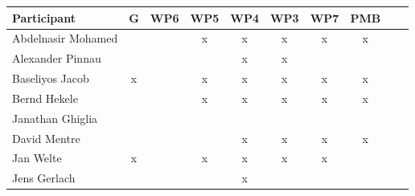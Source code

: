 \documentclass[a4paper, 11pt]{article}
\begin{document}
\begin{tabular}{|l|c|c|c|c|c|c|c||c|c|}
\hline
\textbf{Participant}  & \textbf{G} & \textbf{WP6} &  \textbf{WP5} & \textbf{WP4}&  \textbf{WP3} & \textbf{WP7}&  \textbf{PMB} \\\hline
Abdelnasir Mohamed    &   &   & x & x & x & x & x \\\hline 
Alexander Pinnau      &   &   &   & x & x &   &   \\\hline  
Baseliyos Jacob       & x &   & x & x & x & x & x \\\hline 
Bernd Hekele          &   &   & x & x & x & x & x \\\hline
Janathan Ghiglia      &   &   &   &   &   &   &   \\\hline
David Mentre          &   &   &   & x & x & x & x \\\hline
Jan Welte             & x &   & x & x & x & x &   \\\hline
Jens Gerlach          &   &   &   & x &  &  &   \\\hline

\end{tabular}
\end{document}
